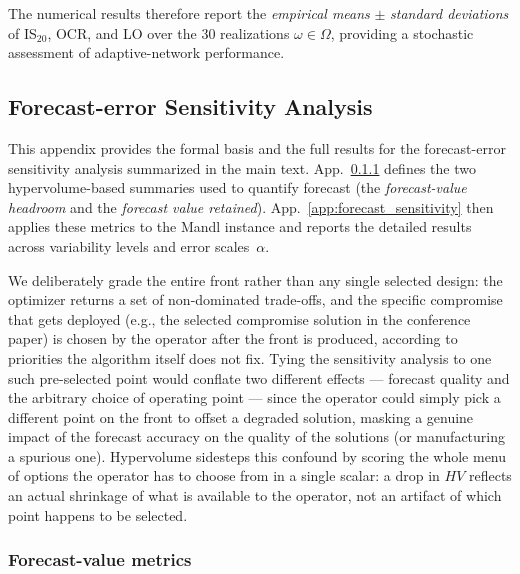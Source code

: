 \documentclass[a4paper,fleqn]{cas-sc}
\begin{document}
The numerical results therefore report the \emph{empirical means} $\pm$ \emph{standard deviations} of IS$_{20}$, OCR, and LO over the 30 realizations $\omega \in \Omega$, providing a stochastic assessment of adaptive-network performance.

\subsection{Forecast-error Sensitivity Analysis}
\label{app:forecastValue}

This appendix provides the formal basis and the full results for the forecast-error sensitivity analysis summarized in the main text. App.~\ref{app:forecastValueMetrics} defines the two hypervolume-based summaries used to quantify  forecast  (the \emph{forecast-value headroom} and the \emph{forecast value retained}). App.~\ref{app:forecast_sensitivity} then applies these metrics to the Mandl instance and reports the detailed results across variability levels and error scales~$\alpha$.

We deliberately grade the entire front rather than any single selected design: the optimizer returns a set of non-dominated trade-offs, and the specific compromise that gets deployed (e.g., the selected compromise solution in the conference paper) is chosen by the operator after the front is produced, according to priorities the algorithm itself does not fix. Tying the sensitivity analysis to one such pre-selected point would conflate two different effects — forecast quality and the arbitrary choice of operating point — since the operator could simply pick a different point on the front to offset a degraded solution, masking a genuine impact of the forecast accuracy on the quality of the solutions (or manufacturing a spurious one). Hypervolume sidesteps this confound by scoring the whole menu of options the operator has to choose from in a single scalar: a drop in $HV$ reflects an actual shrinkage of what is available to the operator, not an artifact of which point happens to be selected.

\subsubsection{Forecast-value metrics}
\label{app:forecastValueMetrics}
\end{document}

